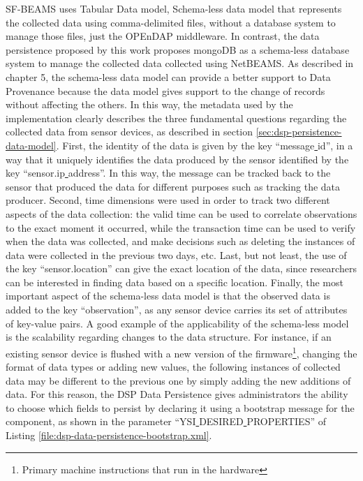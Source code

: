 SF-BEAMS uses Tabular Data model, Schema-less data model that represents the
collected data using comma-delimited files, without a database system to manage
those files, just the OPEnDAP middleware. In contrast, the data persistence
proposed by this work proposes mongoDB as a schema-less database system to
manage the collected data collected using NetBEAMS. As described in chapter 5,
the schema-less data model can provide a better support to Data Provenance
because the data model gives support to the change of records without affecting
the others. In this way, the metadata used by the implementation clearly
describes the three fundamental questions regarding the collected data from
sensor devices, as described in section \ref{sec:dsp-persistence-data-model}.
First, the identity of the data is given by the key ``message\underline{
}id'', in a way that it uniquely identifies the data produced by the sensor
identified by the key ``sensor.ip\underline{ }address''. In this way, the
message can be tracked back to the sensor that produced the data for different
purposes such as tracking the data producer. Second, time dimensions were used
in order to track two different aspects of the data collection: the valid time
can be used to correlate observations to the exact moment it occurred, while
the transaction time can be used to verify when the data was collected, and
make decisions such as deleting the instances of data were collected in the
previous two days, etc. Last, but not least, the use of the key
``sensor.location'' can give the exact location of the data, since researchers
can be interested in finding data based on a specific location. Finally, the
most important aspect of the schema-less data model is that the observed data
is added to the key ``observation'', as any sensor device carries its set of
attributes of key-value pairs. A good example of the applicability of the
schema-less model is the scalability regarding changes to the data structure.
For instance, if an existing sensor device is flushed with a new version of
the firmware\footnote{Primary machine instructions that run in the hardware},
changing the format of data types or adding new values, the following instances
of collected data may be different to the previous one by simply adding the
new additions of data. For this reason, the DSP Data Persistence gives
administrators the ability to choose which fields to persist by declaring it
using a bootstrap message for the component, as shown in the parameter
``YSI\underline{ }DESIRED\underline{ }PROPERTIES'' of Listing
\ref{file:dsp-data-persistence-bootstrap.xml}.

